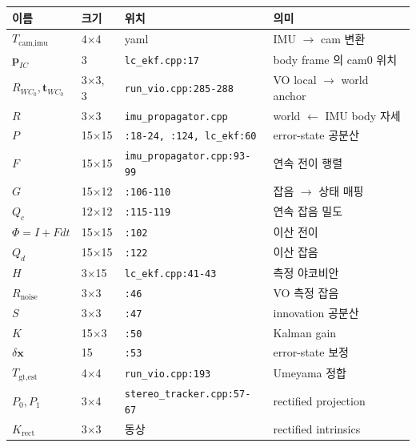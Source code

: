 \documentclass[11pt,a4paper,oneside]{report}
\begin{document}
\begin{center}\small
\begin{longtable}{lllp{}}
\toprule
이름 & 크기 & 위치 & 의미 \\
\midrule\endhead
\(T_{\text{cam,imu}}\) & 4$\times$4 & yaml & IMU \(\to\) cam 변환 \\
\(\bm{p}_{IC}\) & 3 & \texttt{lc\_ekf.cpp:17} & body frame 의 cam0 위치 \\
\(R_{WC_0}, \bm{t}_{WC_0}\) & 3$\times$3, 3 & \texttt{run\_vio.cpp:285-288} & VO local \(\to\) world anchor \\
\(R\) & 3$\times$3 & \texttt{imu\_propagator.cpp} & world \(\leftarrow\) IMU body 자세 \\
\(P\) & 15$\times$15 & \texttt{:18-24, :124, lc\_ekf:60} & error-state 공분산 \\
\(F\) & 15$\times$15 & \texttt{imu\_propagator.cpp:93-99} & 연속 전이 행렬 \\
\(G\) & 15$\times$12 & \texttt{:106-110} & 잡음 \(\to\) 상태 매핑 \\
\(Q_c\) & 12$\times$12 & \texttt{:115-119} & 연속 잡음 밀도 \\
\(\Phi = I + Fdt\) & 15$\times$15 & \texttt{:102} & 이산 전이 \\
\(Q_d\) & 15$\times$15 & \texttt{:122} & 이산 잡음 \\
\(H\) & 3$\times$15 & \texttt{lc\_ekf.cpp:41-43} & 측정 야코비안 \\
\(R_{\text{noise}}\) & 3$\times$3 & \texttt{:46} & VO 측정 잡음 \\
\(S\) & 3$\times$3 & \texttt{:47} & innovation 공분산 \\
\(K\) & 15$\times$3 & \texttt{:50} & Kalman gain \\
\(\delta\bm{x}\) & 15 & \texttt{:53} & error-state 보정 \\
\(T_{\text{gt,est}}\) & 4$\times$4 & \texttt{run\_vio.cpp:193} & Umeyama 정합 \\
\(P_0, P_1\) & 3$\times$4 & \texttt{stereo\_tracker.cpp:57-67} & rectified projection \\
\(K_{\text{rect}}\) & 3$\times$3 & 동상 & rectified intrinsics \\
\bottomrule
\end{longtable}
\end{center}
\end{document}
